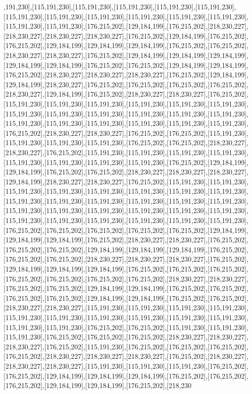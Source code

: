 ,191,230],[115,191,230],[115,191,230],[115,191,230],[115,191,230],[115,191,230],[115,191,230],[115,191,230],[115,191,230],[115,191,230],[115,191,230],[115,191,230],[115,191,230],[115,191,230],[176,215,202],[129,184,199],[176,215,202],[218,230,227],[218,230,227],[218,230,227],[218,230,227],[176,215,202],[129,184,199],[176,215,202],[176,215,202],[129,184,199],[129,184,199],[129,184,199],[176,215,202],[176,215,202],[218,230,227],[218,230,227],[176,215,202],[129,184,199],[129,184,199],[129,184,199],[129,184,199],[129,184,199],[176,215,202],[176,215,202],[129,184,199],[129,184,199],[176,215,202],[218,230,227],[218,230,227],[218,230,227],[176,215,202],[129,184,199],[129,184,199],[218,230,227],[176,215,202],[176,215,202],[176,215,202],[176,215,202],[218,230,227],[129,184,199],[176,215,202],[218,230,227],[218,230,227],[176,215,202],[115,191,230],[115,191,230],[115,191,230],[115,191,230],[115,191,230],[115,191,230],[115,191,230],[115,191,230],[115,191,230],[115,191,230],[115,191,230],[115,191,230],[115,191,230],[115,191,230],[115,191,230],[115,191,230],[115,191,230],[115,191,230],[176,215,202],[218,230,227],[218,230,227],[176,215,202],[176,215,202],[115,191,230],[115,191,230],[115,191,230],[115,191,230],[176,215,202],[176,215,202],[218,230,227],[218,230,227],[176,215,202],[115,191,230],[115,191,230],[115,191,230],[115,191,230],[115,191,230],[115,191,230],[115,191,230],[115,191,230],[176,215,202],[129,184,199],[129,184,199],[176,215,202],[176,215,202],[218,230,227],[218,230,227],[218,230,227],[129,184,199],[218,230,227],[218,230,227],[176,215,202],[115,191,230],[115,191,230],[115,191,230],[115,191,230],[115,191,230],[115,191,230],[115,191,230],[115,191,230],[115,191,230],[115,191,230],[115,191,230],[115,191,230],[115,191,230],[115,191,230],[115,191,230],[115,191,230],[115,191,230],[115,191,230],[115,191,230],[115,191,230],[115,191,230],[115,191,230],[115,191,230],[115,191,230],[115,191,230],[115,191,230],[176,215,202],[176,215,202],[176,215,202],[176,215,202],[176,215,202],[129,184,199],[129,184,199],[129,184,199],[176,215,202],[218,230,227],[218,230,227],[176,215,202],[176,215,202],[176,215,202],[129,184,199],[129,184,199],[129,184,199],[176,215,202],[176,215,202],[176,215,202],[218,230,227],[218,230,227],[218,230,227],[176,215,202],[129,184,199],[129,184,199],[129,184,199],[176,215,202],[176,215,202],[176,215,202],[176,215,202],[176,215,202],[176,215,202],[176,215,202],[218,230,227],[218,230,227],[176,215,202],[176,215,202],[129,184,199],[129,184,199],[176,215,202],[176,215,202],[176,215,202],[176,215,202],[129,184,199],[129,184,199],[176,215,202],[176,215,202],[218,230,227],[218,230,227],[115,191,230],[115,191,230],[115,191,230],[115,191,230],[115,191,230],[115,191,230],[115,191,230],[115,191,230],[115,191,230],[115,191,230],[115,191,230],[115,191,230],[176,215,202],[176,215,202],[115,191,230],[115,191,230],[115,191,230],[176,215,202],[176,215,202],[176,215,202],[218,230,227],[218,230,227],[218,230,227],[176,215,202],[115,191,230],[176,215,202],[176,215,202],[176,215,202],[176,215,202],[218,230,227],[218,230,227],[218,230,227],[176,215,202],[218,230,227],[218,230,227],[218,230,227],[115,191,230],[115,191,230],[115,191,230],[176,215,202],[176,215,202],[129,184,199],[129,184,199],[129,184,199],[176,215,202],[176,215,202],[176,215,202],[129,184,199],[129,184,199],[176,215,202],[218,230